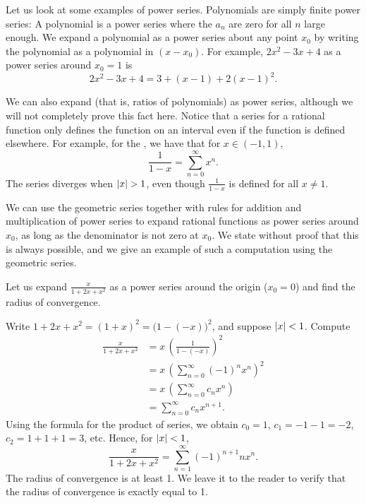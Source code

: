 Let us look at some examples of power series.
Polynomials are simply finite power series:  A polynomial
is a power series where
the $a_n$ are zero for all $n$ large enough.  We expand
a polynomial as a power series about any point $x_0$ by writing
the polynomial as a polynomial in $(x-x_0)$.  For example,
$2x^2-3x+4$ as a power series around $x_0 = 1$ is
\begin{equation*}
2x^2-3x+4 = 3 + (x-1) + 2{(x-1)}^2 .
\end{equation*}

We can also expand
\emph{} (that is, ratios of polynomials)
as power series, although we will not completely prove this fact here.
Notice that a series for a rational function only defines the function
on an interval even if the function is defined elsewhere.  For example, for
the \emph{}, we have that for
$x \in (-1,1)$,
\begin{equation*}
\frac{1}{1-x} =
\sum_{n=0}^\infty x^n .
\end{equation*}
The series diverges when $\left\lvert {x} \right\rvert > 1$, even though $\frac{1}{1-x}$ is
defined for all $x \not= 1$.

We can use the geometric series together with rules for addition and
multiplication of power series to expand rational functions as power
series around $x_0$,
as long as the denominator is not zero at $x_0$.  We state without
proof that this is always possible, and we give an example of such
a computation using the geometric series.

\begin{example}
Let us expand $\frac{x}{1+2x+x^2}$ as a power series around the origin ($x_0 = 0$) and
find the radius of convergence.

Write $1+2x+x^2 = {(1+x)}^2 = {\bigl(1-(-x)\bigr)}^2$, and suppose
$\left\lvert {x} \right\rvert < 1$.  Compute
\begin{equation*}
\begin{split}
\frac{x}{1+2x+x^2}
&=
x \,
{\left(
\frac{1}{1-(-x)}
\right)}^2
\\
&=
x \,
{\left( 
\sum_{n=0}^\infty {(-1)}^n x^n 
\right)}^2
\\
&=
x \,
\left(
\sum_{n=0}^\infty c_n x^n 
\right)
\\
&=
\sum_{n=0}^\infty c_n x^{n+1} .
\end{split}
\end{equation*}
Using the formula for the product of series,
we obtain $c_0 = 1$, $c_1 = -1 -1 = -2$, $c_2 = 1+1+1 = 3$, etc.
Hence, for $\left\lvert {x} \right\rvert < 1$, 
\begin{equation*}
\frac{x}{1+2x+x^2}
=
\sum_{n=1}^\infty {(-1)}^{n+1} n x^n .
\end{equation*}
The radius of convergence is at least 1.  We leave it to the reader to
verify that the radius of convergence is exactly equal to 1.
\end{example}

